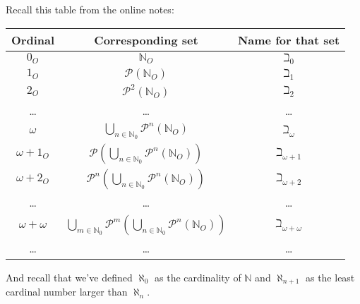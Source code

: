 \documentclass[justified]{tufte-handout}
\begin{document}
Recall this table from the online notes:

\begin{table}[htdp]
\begin{center}
\begin{tabular}{|c|c|c|}
Ordinal & 	Corresponding set & 	Name for that set  \\ \hline\hline
$0_O$ & $\mathbb{N}_O$ & $\beth_0$\\
$1_O$ & $\mathcal{P}(\mathbb{N}_O)$ & $\beth_1$\\
$2_O$ & $\mathcal{P}^2(\mathbb{N}_O)$ & $\beth_2$\\
\dots & \dots & \dots\\
$\omega$ & $\bigcup\limits_{n\in\mathbb{N}_0}\mathcal{P}^n(\mathbb{N}_O)$ & $\beth_\omega$\\
$\omega+1_O$ & $\mathcal{P}(\bigcup\limits_{n\in\mathbb{N}_0}\mathcal{P}^n(\mathbb{N}_O))$ & $\beth_{\omega+1}$\\
$\omega+2_O$ & $\mathcal{P}^n(\bigcup\limits_{n\in\mathbb{N}_0}\mathcal{P}^n(\mathbb{N}_O))$ & $\beth_{\omega+2}$\\
\dots & \dots & \dots\\
$\omega+\omega$ & $\bigcup\limits_{m\in\mathbb{N}_0}\mathcal{P}^m(\bigcup\limits_{n\in\mathbb{N}_0}\mathcal{P}^n(\mathbb{N}_O))$ & $\beth_{\omega+\omega}$\\
\dots & \dots & \dots
\end{tabular}
\end{center}
\label{default}
\end{table}%
\noindent And recall that we've defined $\aleph_0$ as the cardinality of $\mathbb{N}$ and $\aleph_{n+1}$ as the least cardinal number larger than $\aleph_{n}$.
\end{document}
